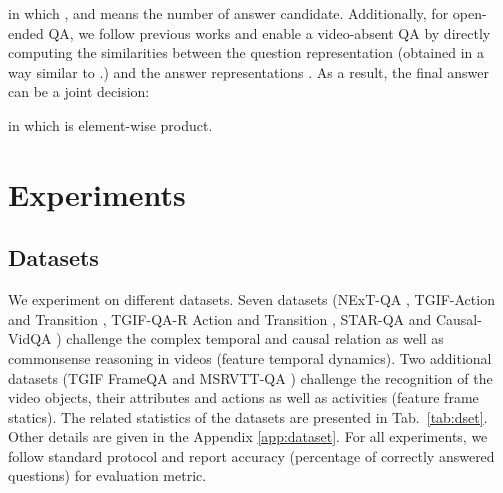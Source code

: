 \documentclass[10pt,journal,compsoc]{IEEEtran}
\begin{document}
in which , and  means the number of answer candidate.
Additionally, for open-ended QA, we follow previous works \cite{xiao2021video} and enable a video-absent QA by directly computing the similarities between the question representation  (obtained in a way similar to .) and the answer representations . As a result, the final answer can be a joint decision: 

in which  is element-wise product. 
 

\section{Experiments}
\label{sec:exp}

\subsection{Datasets}
We experiment on different datasets. Seven datasets (NExT-QA \cite{xiao2021next}, TGIF-Action and Transition \cite{jang2017tgif}, TGIF-QA-R Action and Transition \cite{peng2021progressive}, STAR-QA \cite{wu2021star} and Causal-VidQA \cite{li2022representation}) challenge the complex temporal and causal relation as well as commonsense reasoning in videos (feature temporal dynamics). Two additional datasets (TGIF FrameQA \cite{jang2017tgif} and MSRVTT-QA \cite{xu2017video}) challenge the recognition of the video objects, their attributes and actions as well as activities (feature frame statics).
The related statistics of the datasets are presented in Tab.~\ref{tab:dset}. Other details are given in the Appendix \ref{app:dataset}. For all experiments, we follow standard protocol and report accuracy (percentage of correctly answered questions) for evaluation metric.
\end{document}
